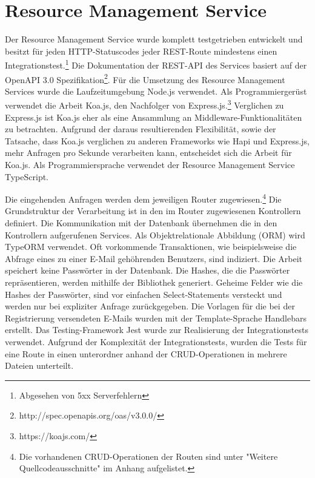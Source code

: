 \section{Resource Management Service}
\label{sec:resourcemanagementservice}
Der Resource Management Service wurde komplett testgetrieben entwickelt und besitzt
für jeden HTTP-Statuscodes jeder REST-Route mindestens einen Integrationstest.\footnote{Abgesehen von 5xx Serverfehlern}
Die Dokumentation der REST-API des Services basiert auf der OpenAPI 3.0
Spezifikation\footnote{http://spec.openapis.org/oas/v3.0.0/}. Für die Umsetzung des Resource Management Services
wurde die Laufzeitumgebung Node.js verwendet. Als Programmiergerüst verwendet die Arbeit Koa.js, den Nachfolger
von Express.js.\footnote{https://koajs.com/} Verglichen zu Express.js ist Koa.js eher als eine Ansammlung
an Middleware-Funktionalitäten zu betrachten\cite[2. Absatz]{ExpressVsKoa}. Aufgrund der daraus resultierenden
Flexibilität, sowie der Tatsache, dass Koa.js verglichen zu anderen Frameworks wie Hapi und Express.js,
mehr Anfragen pro Sekunde verarbeiten kann,\cite{ExpressVsKoaVsHapiPerformance}
entscheidet sich die Arbeit für Koa.js. Als Programmiersprache verwendet der Resource Management Service
TypeScript.

Die eingehenden Anfragen werden dem jeweiligen Router zugewiesen.\footnote{Die vorhandenen CRUD-Operationen der Routen sind
unter "Weitere Quellcodeausschnitte" im Anhang aufgelistet.} Die Grundstruktur der Verarbeitung ist in den im Router
zugewiesenen Kontrollern definiert. Die Kommunikation mit der Datenbank übernehmen die in den Kontrollern aufgerufenen
Services. Als Objektrelationale Abbildung (ORM) wird TypeORM verwendet. Oft vorkommende Transaktionen, wie beispielsweise
die Abfrage eines zu einer E-Mail gehöhrenden Benutzers, sind indiziert. Die Arbeit speichert keine Passwörter in der
Datenbank. Die Hashes, die die Passwörter repräsentieren, werden mithilfe der Bibliothek  generiert.
Geheime Felder wie die Hashes der Passwörter, sind vor einfachen Select-Statements versteckt und werden nur bei
expliziter Anfrage zurückgegeben. Die Vorlagen für die bei der Registrierung versendeten E-Mails wurden mit
der Template-Sprache Handlebars erstellt. Das Testing-Framework Jest wurde zur Realisierung der Integrationstests
verwendet. Aufgrund der Komplexität der Integrationstests, wurden die Tests für eine Route in einen unterordner
anhand der CRUD-Operationen in mehrere Dateien unterteilt.

